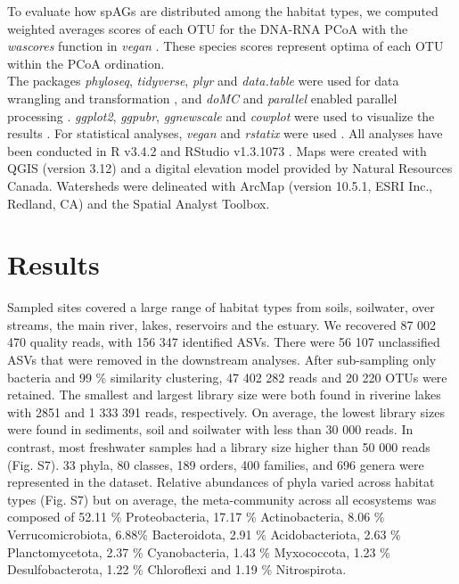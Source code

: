 \documentclass[12pt,a4paper]{article} %
\begin{document}
To evaluate how spAGs are distributed among the habitat types, we computed weighted averages scores of each OTU for the DNA-RNA PCoA with the \textit{wascores} function in \textit{vegan} \citep{Oksanen2017}. These species scores represent optima of each OTU within the PCoA ordination.\\[.3cm]

The packages \textit{phyloseq}, \textit{tidyverse}, \textit{plyr} and \textit{data.table} were used for data wrangling and transformation \citep{McMurdie2013,Wickham2019, Wickham2011, Dowle2019}, and \textit{doMC} and \textit{parallel} enabled parallel processing \citep{Analytics2019, RCoreTeam2017}. \textit{ggplot2}, \textit{ggpubr}, \textit{ggnewscale} and \textit{cowplot} were used to visualize the results \citep{Wickham2016, Kassambara2018, Campitelli2020, Wilke2019}. For statistical analyses, \textit{vegan} and \textit{rstatix} were used \citep{Oksanen2017, Kassambara2020}. All analyses have been conducted in R v3.4.2 \citep{RCoreTeam2017} and RStudio v1.3.1073 \citep{RStudioTeam2016}. Maps were created with QGIS (version 3.12) and a digital elevation model provided by Natural Resources Canada. Watersheds were delineated with ArcMap (version 10.5.1, ESRI Inc., Redland, CA) and the Spatial Analyst Toolbox.

\section*{Results}
Sampled sites covered a large range of habitat types from soils, soilwater, over streams, the main river, lakes, reservoirs and the estuary. We recovered 87 002 470 quality reads, with 156 347 identified ASVs. There were 56 107 unclassified ASVs that were removed in the downstream analyses. After sub-sampling only bacteria and 99 \% similarity clustering, 47 402 282 reads and 20 220 OTUs were retained. The smallest and largest library size were both found in riverine lakes with 2851 and 1 333 391 reads, respectively. On average, the lowest library sizes were found in sediments, soil and soilwater with less than 30 000 reads. In contrast, most freshwater samples had a library size higher than 50 000 reads (Fig. S7). 33 phyla, 80 classes,  189 orders, 400 families, and 696 genera were represented in the dataset. Relative abundances of phyla varied across habitat types (Fig. S7) but on average, the meta-community across all ecosystems was composed of 52.11 \% Proteobacteria, 17.17 \% Actinobacteria, 8.06 \% Verrucomicrobiota, 6.88\% Bacteroidota, 2.91 \% Acidobacteriota, 2.63 \% Planctomycetota, 2.37 \% Cyanobacteria, 1.43 \% Myxococcota, 1.23 \% Desulfobacterota, 1.22 \% Chloroflexi and 1.19 \% Nitrospirota.
\end{document}

